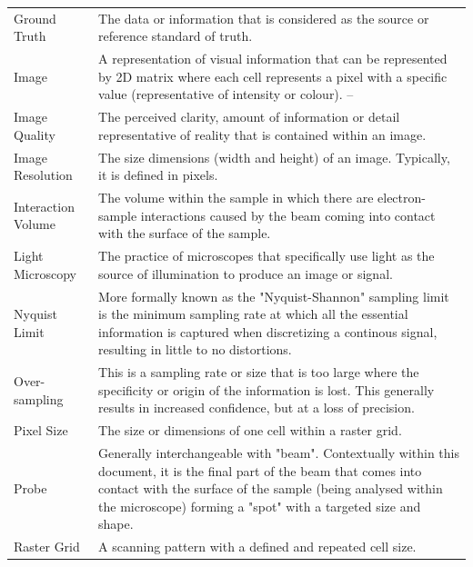 \documentclass[12pt]{article}
\begin{document}
\begin{center}
\begin{longtable}{p{4.25cm} p{11.25cm}}
        Ground Truth & The data or information that is considered as the source or reference standard of truth. \\
        
        Image & A representation of visual information that can be represented by 2D matrix where each cell represents a pixel with a specific value (representative of intensity or colour). -- \\
        
        Image Quality & The perceived clarity, amount of information or detail representative of reality that is contained within an image. \\
        
        Image Resolution & The size dimensions (width and height) of an image. Typically, it is defined in pixels. \\
        
        Interaction Volume & The volume within the sample in which there are electron-sample interactions caused by the beam coming into contact with the surface of the sample. \\
        
        Light Microscopy & The practice of microscopes that specifically use light as the source of illumination to produce an image or signal. \\
        
        Nyquist Limit & More formally known as the "Nyquist-Shannon" sampling limit is the minimum sampling rate at which all the essential information is captured when discretizing a continous signal, resulting in little to no distortions. \\
        
        Over-sampling & This is a sampling rate or size that is too large where the specificity or origin of the information is lost. This generally results in increased confidence, but at a loss of precision.\\
        
        Pixel Size & The size or dimensions of one cell within a raster grid. \\
        
        Probe & Generally interchangeable with "beam". Contextually within this document, it is the final part of the beam that comes into contact with the surface of the sample (being analysed within the microscope) forming a "spot" with a targeted size and shape. \\
        
        Raster Grid & A scanning pattern with a defined and repeated cell size. \\
        

\end{longtable}
\end{center}
\end{document}
